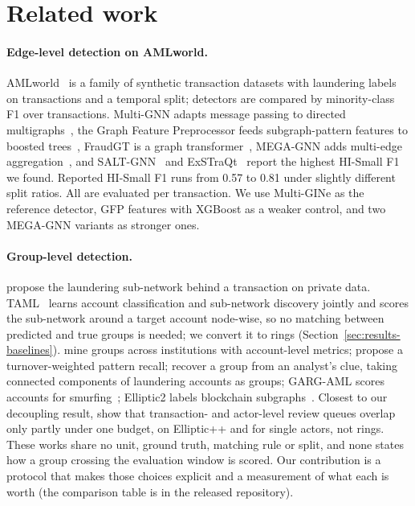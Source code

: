 \section{Related work}
\label{sec:related}

\paragraph{Edge-level detection on AMLworld.}
AMLworld~\citep{altman2023} is a family of synthetic transaction datasets with laundering
labels on transactions and a temporal split; detectors are compared by minority-class F1 over
transactions. Multi-GNN adapts message passing to directed multigraphs~\citep{egressy2024}, the
Graph Feature Preprocessor feeds subgraph-pattern features to boosted trees~\citep{blanusa2024},
FraudGT is a graph transformer~\citep{lin2024fraudgt}, MEGA-GNN adds multi-edge
aggregation~\citep{bilgi2024}, and SALT-GNN~\citep{losavio2026salt} and
ExSTraQt~\citep{tariq2026exstraqt} report the highest HI-Small F1 we found. Reported HI-Small F1
runs from 0.57 to 0.81 under slightly different split ratios. All are evaluated per transaction.
We use Multi-GINe as the reference detector, GFP features with XGBoost as a weaker control, and
two MEGA-GNN variants as stronger ones.

\paragraph{Group-level detection.}
\citet{chai2023} propose the laundering sub-network behind a transaction on private data.
TAML~\citep{rico2026} learns account classification and sub-network discovery jointly and scores
the sub-network around a target account node-wise, so no matching between predicted and true
groups is needed; we convert it to rings (Section~\ref{sec:results-baselines}). \citet{tian2025}
mine groups across institutions with account-level metrics; \citet{tariq2026redirect} propose a
turnover-weighted pattern recall; \citet{wang2026clue} recover a group from an analyst's clue,
taking connected components of laundering accounts as groups; GARG-AML scores accounts for
smurfing~\citep{deprez2025garg,li2020flowscope}; Elliptic2 labels blockchain
subgraphs~\citep{bellei2024,song2024revtrack}. Closest to our decoupling result,
\citet{malik2026queues} show that transaction- and actor-level review queues overlap only
partly under one budget, on Elliptic++ and for single actors, not rings. These works share no
unit, ground truth, matching rule or split, and none states how a group crossing the evaluation
window is scored. Our contribution is a protocol that makes those choices explicit and a
measurement of what each is worth (the comparison table is in the released repository).

